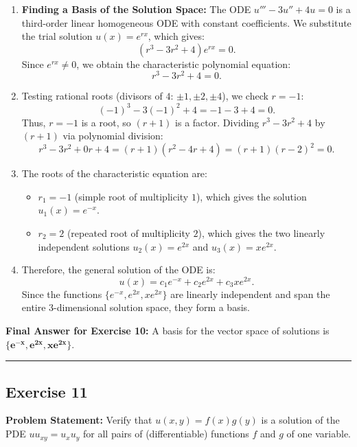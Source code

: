 \documentclass[11pt,a4paper]{article}
\begin{document}
\begin{enumerate}
    \item \textbf{Finding a Basis of the Solution Space:}
    The ODE $u''' - 3u'' + 4u = 0$ is a third-order linear homogeneous ODE with constant coefficients. We substitute the trial solution $u(x) = e^{rx}$, which gives:
    \[
        (r^3 - 3r^2 + 4)e^{rx} = 0.
    \]
    Since $e^{rx} \neq 0$, we obtain the characteristic polynomial equation:
    \[
        r^3 - 3r^2 + 4 = 0.
    \]
    \item Testing rational roots (divisors of $4$: $\pm 1, \pm 2, \pm 4$), we check $r = -1$:
    \[
        (-1)^3 - 3(-1)^2 + 4 = -1 - 3 + 4 = 0.
    \]
    Thus, $r = -1$ is a root, so $(r + 1)$ is a factor. Dividing $r^3 - 3r^2 + 4$ by $(r + 1)$ via polynomial division:
    \[
        r^3 - 3r^2 + 0r + 4 = (r + 1)(r^2 - 4r + 4) = (r + 1)(r - 2)^2 = 0.
    \]
    \item The roots of the characteristic equation are:
    \begin{itemize}
        \item $r_1 = -1$ (simple root of multiplicity $1$), which gives the solution $u_1(x) = e^{-x}$.
        \item $r_2 = 2$ (repeated root of multiplicity $2$), which gives the two linearly independent solutions $u_2(x) = e^{2x}$ and $u_3(x) = x e^{2x}$.
    \end{itemize}
    \item Therefore, the general solution of the ODE is:
    \[
        u(x) = c_1 e^{-x} + c_2 e^{2x} + c_3 x e^{2x}.
    \]
    Since the functions $\{e^{-x}, e^{2x}, x e^{2x}\}$ are linearly independent and span the entire 3-dimensional solution space, they form a basis.
\end{enumerate}

\textbf{Final Answer for Exercise 10:} A basis for the vector space of solutions is $\mathbf{\{e^{-x}, e^{2x}, x e^{2x}\}}$.

\bigskip
\hrule
\bigskip

\subsection*{Exercise 11}
\textbf{Problem Statement:} Verify that $u(x, y) = f(x)g(y)$ is a solution of the PDE $u u_{xy} = u_x u_y$ for all pairs of (differentiable) functions $f$ and $g$ of one variable.
\end{document}
